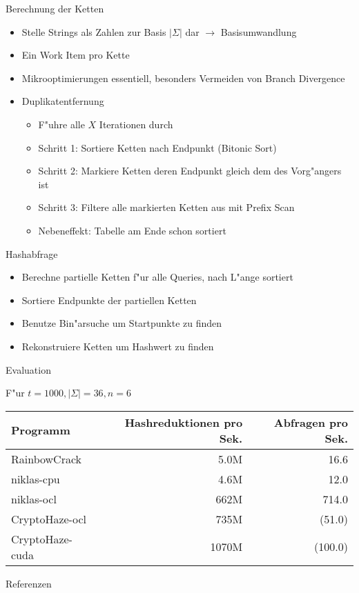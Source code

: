 \documentclass[ngerman,hyperref={pdfpagelabels=true}]{beamer}
\begin{document}
\begin{frame}{Berechnung der Ketten}
  \begin{itemize}
  \item Stelle Strings als Zahlen zur Basis $|\Sigma|$ dar $\rightarrow$ Basisumwandlung
  \item Ein Work Item pro Kette
  \item Mikrooptimierungen essentiell, besonders Vermeiden von Branch Divergence
  \item Duplikatentfernung
  \begin{itemize}
    \item F"uhre alle $X$ Iterationen durch
    \item Schritt 1: Sortiere Ketten nach Endpunkt (Bitonic Sort)
    \item Schritt 2: Markiere Ketten deren Endpunkt gleich dem des Vorg"angers ist
    \item Schritt 3: Filtere alle markierten Ketten aus mit Prefix Scan~\cite{blelloch10}
    \item Nebeneffekt: Tabelle am Ende schon sortiert
  \end{itemize}
  \end{itemize}
\end{frame}

\begin{frame}{Hashabfrage}
  \begin{itemize}
  \item Berechne partielle Ketten f"ur alle Queries, nach L"ange sortiert
  \item Sortiere Endpunkte der partiellen Ketten
  \item Benutze Bin"arsuche um Startpunkte zu finden
  \item Rekonstruiere Ketten um Hashwert zu finden
  \end{itemize}
\end{frame}

\begin{frame}{Evaluation}

F"ur $t = 1000, |\Sigma| = 36, n = 6$
\\[1em]

  \begin{tabular}[]{l | r | r}
Programm        & Hashreduktionen pro Sek. & Abfragen pro Sek. \\ \hline
RainbowCrack    & 5.0M   &  16.6 \\
niklas-cpu      & 4.6M   &  12.0 \\
niklas-ocl      & 662M   &  714.0 \\
CryptoHaze-ocl  & 735M   &  (51.0) \\
CryptoHaze-cuda & 1070M  &  (100.0)
  \end{tabular}

\end{frame}

\begin{frame}{Referenzen}


\end{frame}
\end{document}
